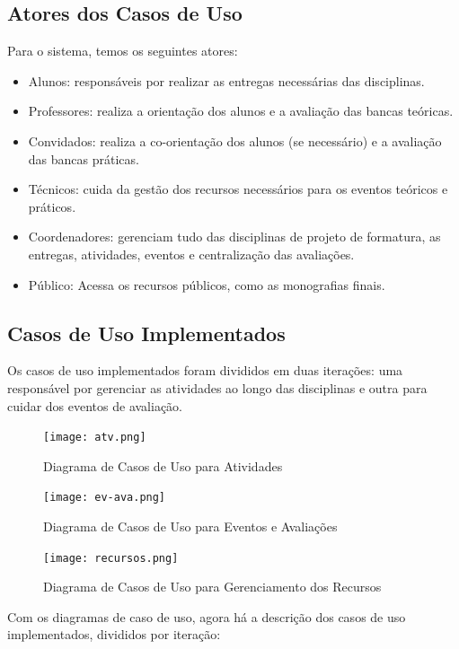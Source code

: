 \subsection{Atores dos Casos de Uso}
Para o sistema, temos os seguintes atores:

\begin{itemize}
    \item Alunos: responsáveis por realizar as entregas necessárias das disciplinas.
    \item Professores: realiza a orientação dos alunos e a avaliação das bancas teóricas.
    \item Convidados: realiza a co-orientação dos alunos (se necessário) e a avaliação das bancas práticas.
    \item Técnicos: cuida da gestão dos recursos necessários para os eventos teóricos e práticos.
    \item Coordenadores: gerenciam tudo das disciplinas de projeto de formatura, as entregas, atividades, eventos e centralização das avaliações.
    \item Público: Acessa os recursos públicos, como as monografias finais.
\end{itemize}

\subsection{Casos de Uso Implementados}
Os casos de uso implementados foram divididos em duas iterações: uma responsável por gerenciar as atividades ao longo das disciplinas e outra para cuidar dos eventos de avaliação.

\begin{figure}[H]
    \centering
    \texttt{[image: atv.png]}
    \caption{Diagrama de Casos de Uso para Atividades}
    \label{fig:use-case-atv}
\end{figure}

\begin{figure}[H]
    \centering
    \texttt{[image: ev-ava.png]}
    \caption{Diagrama de Casos de Uso para Eventos e Avaliações}
    \label{fig:use-case-ev-ava}
\end{figure}

\begin{figure}[H]
    \centering
    \texttt{[image: recursos.png]}
    \caption{Diagrama de Casos de Uso para Gerenciamento dos Recursos}
    \label{fig:use-case-recursos}
\end{figure}

Com os diagramas de caso de uso, agora há a descrição dos casos de uso implementados, divididos por iteração:

